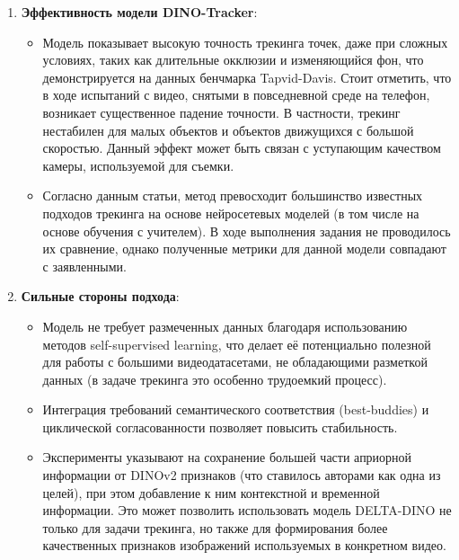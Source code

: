 \documentclass[a4paper, 14pt]{extarticle}
\theoremstyle{definition}
\theoremstyle{plain}
\theoremstyle{remark}
\begin{document}
\begin{enumerate}
    \item \textbf{Эффективность модели DINO-Tracker}:
    \begin{itemize}
        \item Модель показывает высокую точность трекинга точек, даже при сложных условиях, таких как длительные окклюзии и изменяющийся фон, что демонстрируется на данных бенчмарка Tapvid-Davis. Стоит отметить, что в ходе испытаний с видео, снятыми в повседневной среде на телефон, возникает существенное падение точности. В частности, трекинг нестабилен для малых объектов и объектов движущихся с большой скоростью. Данный эффект может быть связан с уступающим качеством камеры, используемой для съемки. 
        \item Согласно данным статьи, метод превосходит большинство известных подходов трекинга на основе нейросетевых моделей (в том числе на основе обучения с учителем). В ходе выполнения задания не проводилось их сравнение, однако полученные метрики для данной модели совпадают с заявленными.
    \end{itemize}

    \item \textbf{Сильные стороны подхода}:
    \begin{itemize}
        \item Модель не требует размеченных данных благодаря использованию методов self-supervised learning, что делает её потенциально полезной для работы с большими видеодатасетами, не обладающими разметкой данных (в задаче трекинга это особенно трудоемкий процесс).
        \item Интеграция требований семантического соответствия (best-buddies) и циклической согласованности позволяет повысить стабильность.
        \item Эксперименты указывают на сохранение большей части априорной информации от DINOv2 признаков (что ставилось авторами как одна из целей), при этом добавление к ним контекстной и временной информации. Это может позволить использовать модель DELTA-DINO не только для задачи трекинга, но также для формирования более качественных признаков изображений используемых в конкретном видео.
    \end{itemize}


\end{enumerate}
\end{document}

